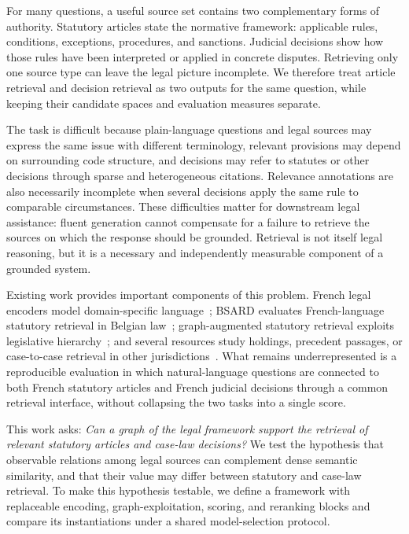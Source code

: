 \documentclass[runningheads]{llncs}
\begin{document}
For many questions, a useful source set contains two complementary forms of authority. Statutory articles state the normative framework: applicable rules, conditions, exceptions, procedures, and sanctions. Judicial decisions show how those rules have been interpreted or applied in concrete disputes. Retrieving only one source type can leave the legal picture incomplete. We therefore treat article retrieval and decision retrieval as two outputs for the same question, while keeping their candidate spaces and evaluation measures separate.

The task is difficult because plain-language questions and legal sources may express the same issue with different terminology, relevant provisions may depend on surrounding code structure, and decisions may refer to statutes or other decisions through sparse and heterogeneous citations. Relevance annotations are also necessarily incomplete when several decisions apply the same rule to comparable circumstances. These difficulties matter for downstream legal assistance: fluent generation cannot compensate for a failure to retrieve the sources on which the response should be grounded. Retrieval is not itself legal reasoning, but it is a necessary and independently measurable component of a grounded system.

Existing work provides important components of this problem. French legal encoders model domain-specific language~\cite{douka2021juribert}; BSARD evaluates French-language statutory retrieval in Belgian law~\cite{louis2022bsard}; graph-augmented statutory retrieval exploits legislative hierarchy~\cite{louis2023finding}; and several resources study holdings, precedent passages, or case-to-case retrieval in other jurisdictions~\cite{zheng2021casehold,tang2024caselink,mahari2024lepard,hou2024clerc}. What remains underrepresented is a reproducible evaluation in which natural-language questions are connected to both French statutory articles and French judicial decisions through a common retrieval interface, without collapsing the two tasks into a single score.

This work asks: \emph{Can a graph of the legal framework support the retrieval of relevant statutory articles and case-law decisions?} We test the hypothesis that observable relations among legal sources can complement dense semantic similarity, and that their value may differ between statutory and case-law retrieval. To make this hypothesis testable, we define a framework with replaceable encoding, graph-exploitation, scoring, and reranking blocks and compare its instantiations under a shared model-selection protocol.
\end{document}
